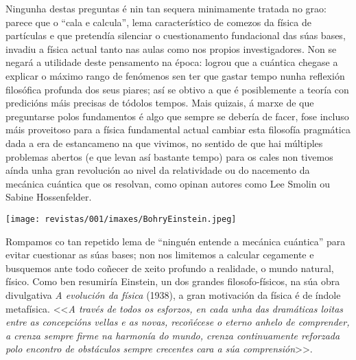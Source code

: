 \begin{multicols}{2}
Ningunha destas preguntas é nin tan
sequera minimamente tratada no grao: parece que o ``cala e calcula'', lema
característico de comezos da física de partículas e que pretendía silenciar o
cuestionamento fundacional das súas bases, invadiu a física actual tanto nas
aulas como nos propios investigadores. Non se negará a utilidade deste
pensamento na época: logrou que a cuántica chegase  a explicar o máximo rango
de fenómenos sen ter que gastar tempo nunha reflexión filosófica profunda dos
seus piares; así se obtivo a que é posiblemente a teoría con predicións máis
precisas de tódolos tempos. Mais quizais, á marxe de que preguntarse polos
fundamentos é algo que sempre se debería de facer, fose incluso máis proveitoso
para a física fundamental actual cambiar esta filosofía pragmática dada a era
de estancameno na que vivimos, no sentido de que hai múltiples problemas
abertos (e que levan así bastante tempo) para os cales non tivemos aínda unha
gran revolución ao nivel da relatividade ou do nacemento da mecánica cuántica
que os resolvan, como opinan autores como Lee Smolin ou Sabine Hossenfelder.

\begin{center}
    \texttt{[image: revistas/001/imaxes/BohryEinstein.jpeg]}
\end{center}

Rompamos co tan repetido lema de ``ninguén entende a mecánica cuántica'' para
evitar cuestionar as súas bases; non nos limitemos a calcular cegamente e
busquemos ante todo coñecer de xeito profundo a realidade, o mundo natural,
físico. Como ben resumiría Einstein, un dos grandes filosofo-físicos, na súa
obra divulgativa \textit{A evolución da física} (1938), a gran motivación da
física é de índole metafísica. <<\textit{A través de todos os esforzos, en cada
unha das dramáticas loitas entre as concepcións vellas e as novas, recoñécese o
eterno anhelo de comprender, a crenza sempre firme na harmonía do mundo, crenza
continuamente reforzada polo encontro de obstáculos sempre crecentes cara a súa
comprensión}>>.

\end{multicols}

